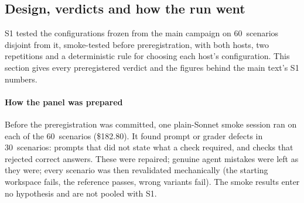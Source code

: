 \documentclass[11pt,letterpaper]{article}
\newcommand{\SOnePanelN}{60}
\newcommand{\SmokeFixed}{30}
\newcommand{\SmokeN}{60}
\newcommand{\SmokeUSD}{182.80}
\newcommand{\mainpaper}{the main text}\newcommand{\thissupp}{these appendices}\newcommand{\Thissupp}{These appendices}
\begin{document}
\subsection{Design, verdicts and how the run went}\label{sec:s1}

S1 tested the configurations frozen from the main campaign on \SOnePanelN\ scenarios disjoint from it, smoke-tested
before preregistration, with both hosts, two repetitions and a deterministic rule for choosing each host's
configuration. This section gives every preregistered verdict and the figures behind \mainpaper{}'s S1 numbers.

\paragraph{How the panel was prepared} Before the preregistration was committed, one plain-Sonnet smoke session ran on
each of the \SmokeN\ scenarios (\$\SmokeUSD). It found prompt or grader defects in \SmokeFixed\ scenarios: prompts that
did not state what a check required, and checks that rejected correct answers. These were repaired; genuine agent
mistakes were left as they were; every scenario was then revalidated mechanically (the starting workspace fails, the
reference passes, wrong variants fail). The smoke results enter no hypothesis and are not pooled with S1.
\end{document}
